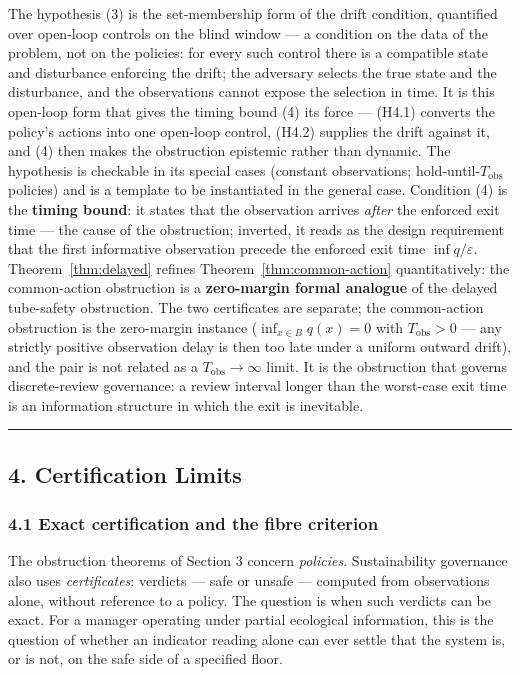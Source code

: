 \documentclass[11pt]{article}
\theoremstyle{definition}
\begin{document}
The hypothesis (3) is the set-membership form of the drift condition,
quantified over open-loop controls on the blind window --- a condition
on the data of the problem, not on the policies: for every such control
there is a compatible state and disturbance enforcing the drift; the
adversary selects the true state and the disturbance, and the
observations cannot expose the selection in time. It is this open-loop form that gives the timing bound (4) its force --- (H4.1) converts
the policy's actions into one open-loop control, (H4.2) supplies the
drift against it, and (4) then makes the obstruction epistemic rather
than dynamic. The hypothesis is checkable in its special cases (constant
observations; hold-until-\(T_{\mathrm{obs}}\) policies) and is a template to be instantiated in the general case. Condition (4) is
the \textbf{timing bound}: it states that the observation arrives
\emph{after} the enforced exit time --- the cause of the obstruction; inverted, it reads as the design requirement that the first informative observation precede the enforced exit time
\(\inf q / \varepsilon\). Theorem~\ref{thm:delayed} refines Theorem~\ref{thm:common-action} quantitatively:
the common-action obstruction is a \textbf{zero-margin formal analogue}
of the delayed tube-safety obstruction. The two certificates are separate; the common-action obstruction is the zero-margin instance
(\(\inf_{x \in B} q(x) = 0\) with \(T_{\mathrm{obs}} > 0\) --- any
strictly positive observation delay is then too late under a uniform
outward drift), and the pair is not related as a
\(T_{\mathrm{obs}} \to \infty\) limit. It is the obstruction that
governs discrete-review governance: a review interval longer than the
worst-case exit time is an information structure in which the exit is
inevitable.

\begin{center}\rule{0.5\linewidth}{0.5pt}\end{center}

\subsection{4. Certification Limits}\label{certification-limits}

\subsubsection{4.1 Exact certification and the fibre
criterion}\label{exact-certification-and-the-fibre-criterion}

The obstruction theorems of Section 3 concern \emph{policies}.
Sustainability governance also uses \emph{certificates}: verdicts
--- safe or unsafe --- computed from observations alone, without
reference to a policy. The question is when such verdicts can be exact.
For a manager operating under partial ecological information, this is
the question of whether an indicator reading alone can ever settle that
the system is, or is not, on the safe side of a specified floor.
\end{document}

